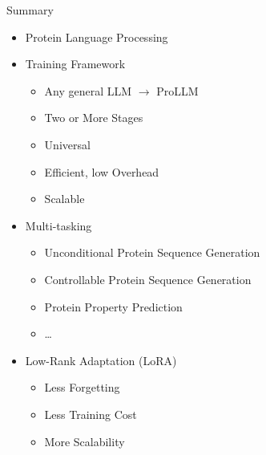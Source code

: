 \begin{frame}{Summary}
	\begin{itemize}
		\item Protein Language Processing
		\item Training Framework
		\begin{itemize}
			\item Any general LLM $\rightarrow$ ProLLM
			\item Two or More Stages
			\item Universal
			\item Efficient, low Overhead
			\item Scalable
		\end{itemize}
		\item Multi-tasking
		\begin{itemize}
			\item Unconditional Protein Sequence Generation
			\item Controllable Protein Sequence Generation
			\item Protein Property Prediction
			\item \dots
		\end{itemize}
		\item %
		Low-Rank Adaptation (LoRA)
		\begin{itemize}
			\item Less Forgetting
			\item Less Training Cost
			\item More Scalability
		\end{itemize}
	\end{itemize}
\end{frame}
